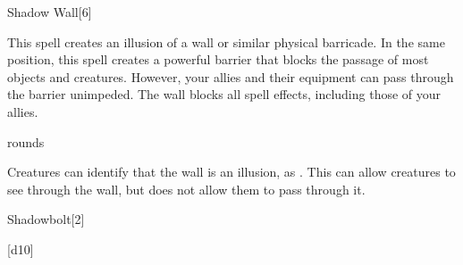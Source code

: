 \begin{spellsection}{Shadow Wall}[6]
    \begin{spellheader}
    \end{spellheader}
    \begin{spellcontent}
        \begin{spelltargetinginfo}
        \end{spelltargetinginfo}
        \begin{spelleffects}
            \spelleffect This spell creates an illusion of a wall or similar physical barricade.
            In the same position, this spell creates a powerful barrier that blocks the passage of most objects and creatures.
            However, your allies and their equipment can pass through the barrier unimpeded.
            The wall blocks all spell effects, including those of your allies.

             rounds
        \end{spelleffects}
    \end{spellcontent}
    \begin{spellfooter}
        \spellnotes Creatures can identify that the wall is an illusion, as .
        This can allow creatures to see through the wall, but does not allow them to pass through it.
        \miscastexplode
    \end{spellfooter}
\end{spellsection}

\begin{spellsection}{Shadowbolt}[2]
    \begin{spellheader}
    \end{spellheader}
    \begin{spellcontent}
        \begin{spelltargetinginfo}
        \end{spelltargetinginfo}
        \begin{spelleffects}
            \spelleffect {}[d10]
        \end{spelleffects}
    \end{spellcontent}
    \begin{spellfooter}
        \spellnotes \subtlespellnotes
        \miscastexplode
    \end{spellfooter}
\end{spellsection}

